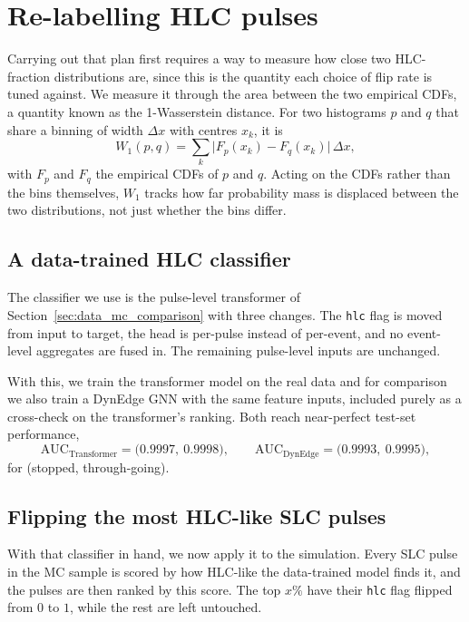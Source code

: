 \section{Re-labelling HLC pulses}
\label{sec:hlc_flip}

Carrying out that plan first requires a way to measure how close two
HLC-fraction distributions are, since this is the quantity each choice
of flip rate is tuned against. We measure it through the area between
the two empirical CDFs, a quantity known as the 1-Wasserstein distance.
For two histograms $p$ and $q$ that share a binning of width $\Delta x$
with centres $x_k$, it is
\[
    W_1(p,q)
    =
    \sum_{k} \bigl| F_p(x_k) - F_q(x_k) \bigr| \, \Delta x ,
\]
with $F_p$ and $F_q$ the empirical CDFs of $p$ and $q$. Acting on the
CDFs rather than the bins themselves, $W_1$ tracks how far probability
mass is displaced between the two distributions, not just whether the
bins differ.

\subsection{A data-trained HLC classifier}

The classifier we use is the pulse-level transformer of
Section~\ref{sec:data_mc_comparison} with three changes. The
\texttt{hlc} flag is moved from input to target, the head is per-pulse
instead of per-event, and no event-level aggregates are fused in. The remaining
pulse-level inputs are unchanged.

With this, we train the transformer model on the real data and for comparison we also train a DynEdge GNN with the same feature inputs, included purely as a cross-check on the
transformer's ranking. Both reach near-perfect test-set performance,
\[
    \mathrm{AUC}_{\mathrm{Transformer}}
    =
    \bigl(0.9997,\ 0.9998\bigr),
    \qquad
    \mathrm{AUC}_{\mathrm{DynEdge}}
    =
    \bigl(0.9993,\ 0.9995\bigr),
\]
for (stopped, through-going).

\subsection{Flipping the most HLC-like SLC pulses}

With that classifier in hand, we now apply it to the simulation. Every
SLC pulse in the MC sample is scored by how HLC-like the data-trained
model finds it, and the pulses are then ranked by this score. The top
$x\%$ have their \texttt{hlc} flag flipped from $0$ to $1$, while the rest are left untouched.

